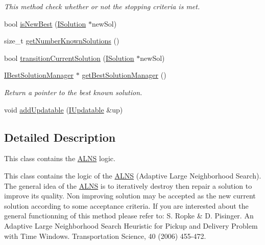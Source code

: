 \begin{DoxyCompactItemize}
\begin{DoxyCompactList}\small\item\em \-This method check whether or not the stopping criteria is met. \end{DoxyCompactList}\item 
bool \hyperlink{classALNS_a3dec1742b0f3e6bfc03a087ccb1cf5ee}{is\-New\-Best} (\hyperlink{classISolution}{\-I\-Solution} $\ast$new\-Sol)
\item 
size\-\_\-t \hyperlink{classALNS_a24567f634de0dd28dc09c7ccde13f7c2}{get\-Number\-Known\-Solutions} ()
\item 
bool \hyperlink{classALNS_a6c9c4ccbbfac3a70ef92dca8fbff68b4}{transition\-Current\-Solution} (\hyperlink{classISolution}{\-I\-Solution} $\ast$new\-Sol)
\item 
\hypertarget{classALNS_a8070a2581e7cee3cb46452eef5f97aaf}{\hyperlink{classIBestSolutionManager}{\-I\-Best\-Solution\-Manager} $\ast$ \hyperlink{classALNS_a8070a2581e7cee3cb46452eef5f97aaf}{get\-Best\-Solution\-Manager} ()}\label{classALNS_a8070a2581e7cee3cb46452eef5f97aaf}

\begin{DoxyCompactList}\small\item\em \-Return a pointer to the best known solution. \end{DoxyCompactList}\item 
void \hyperlink{classALNS_adde152b15ac1197b1b31232ee205072c}{add\-Updatable} (\hyperlink{classIUpdatable}{\-I\-Updatable} \&up)
\end{DoxyCompactItemize}


\subsection{\-Detailed \-Description}
\-This class contains the \hyperlink{classALNS}{\-A\-L\-N\-S} logic. 

\-This class contains the logic of the \hyperlink{classALNS}{\-A\-L\-N\-S} (\-Adaptive \-Large \-Neighborhood \-Search). \-The general idea of the \hyperlink{classALNS}{\-A\-L\-N\-S} is to iteratively destroy then repair a solution to improve its quality. \-Non improving solution may be accepted as the new current solution according to some acceptance criteria. \-If you are interested about the general functionning of this method please refer to\-: \-S. \-Ropke \& \-D. \-Pisinger. \-An \-Adaptive \-Large \-Neighborhood \-Search \-Heuristic for \-Pickup and \-Delivery \-Problem with \-Time \-Windows. \-Transportation \-Science, 40 (2006) 455-\/472. 

